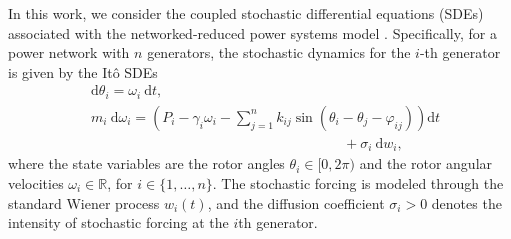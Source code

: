 \documentclass[10pt,twocolumn]{IEEEtran}
\begin{document}
%
%
In this work, we consider the coupled stochastic differential equations (SDEs) associated with the networked-reduced power systems model \cite[Ch. 7]{sauerpai1998}. Specifically, for a power network with $n$ generators, the stochastic dynamics for the $i$-th generator is given by the It\^{o} SDEs
\begin{subequations}
\begin{align}
&{\mathrm{d}}\theta_{i} = \omega_{i}\:{\mathrm{d}}t,\label{RotAngleGen}\\
&m_{i}\:{\mathrm{d}}\omega_{i} =	\left(\!P_{i} - \gamma_{i}\omega_{i} - \displaystyle\sum_{j=1}^{n} k_{ij}\sin\left(\theta_{i}-\theta_{j}-\varphi_{ij}\right)\!\right){\mathrm{d}}t \nonumber\\
&\qquad\qquad\qquad\qquad\qquad\qquad\qquad\qquad\qquad+\sigma_{i}\:{\mathrm{d}}w_{i},
\end{align}
\label{ItoSDEcomponentlevel}
\end{subequations}
where the state variables are the rotor angles $\theta_{i}\in[0,2\pi)$ and the rotor angular velocities $\omega_{i}\in\mathbb{R}$, for $i\in\{1,\hdots,n\}$. The stochastic forcing is modeled through the standard Wiener process $w_{i}(t)$, and the diffusion coefficient $\sigma_{i}>0$ denotes the intensity of stochastic forcing at the $i$th generator.
 
\end{document}
